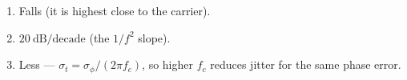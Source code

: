 \begin{enumerate}[leftmargin=1.6em,itemsep=2pt]
\item Falls (it is highest close to the carrier).
\item $20\ \text{dB/decade}$ (the $1/f^2$ slope).
\item Less --- $\sigma_t = \sigma_\phi/(2\pi f_c)$, so higher $f_c$ reduces jitter for the same phase error.
\end{enumerate}
